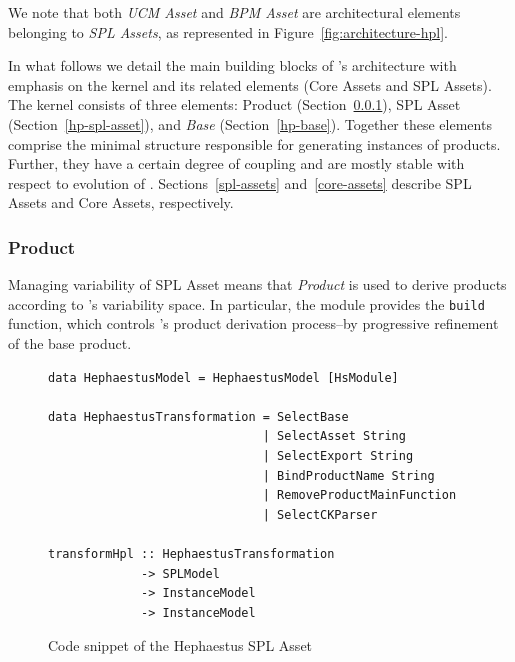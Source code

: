 We note that both \textit{UCM Asset} and \textit{BPM Asset} are architectural elements belonging to \textit{SPL Assets}, as represented in Figure~\ref{fig:architecture-hpl}.



In what follows we detail the main building blocks of \hpl{}'s architecture with emphasis on the kernel and its related elements (Core Assets and SPL Assets).  The kernel consists of three elements: \hp{} Product (Section~\ref{hp-product}), \hp{} SPL Asset (Section~\ref{hp-spl-asset}), and \hp{} \emph{Base} (Section~\ref{hp-base}). Together these elements comprise the minimal structure responsible for generating instances of \hpl{} products. Further, they have a certain degree of coupling and are mostly stable with respect to evolution of \hpl{}. Sections~\ref{spl-assets} and~\ref{core-assets} describe SPL Assets and Core Assets, respectively.


\subsubsection{\hp{} Product} 
\label{hp-product}


Managing variability of \hp{} SPL Asset means that \hp{} \emph{Product} is used to derive products according to \hpl{}'s variability space. In particular, the module provides the \texttt{build} function, which controls \hpl{}'s product derivation process--by progressive refinement of the base product.


\begin{figure}
\begin{lstlisting}
data HephaestusModel = HephaestusModel [HsModule]

data HephaestusTransformation = SelectBase
                              | SelectAsset String
                              | SelectExport String
                              | BindProductName String
                              | RemoveProductMainFunction
                              | SelectCKParser

transformHpl :: HephaestusTransformation
             -> SPLModel
             -> InstanceModel
             -> InstanceModel
\end{lstlisting}
\caption{Code snippet of the Hephaestus SPL Asset}
\label{fig:code-hp-spl-asset}
\end{figure}

